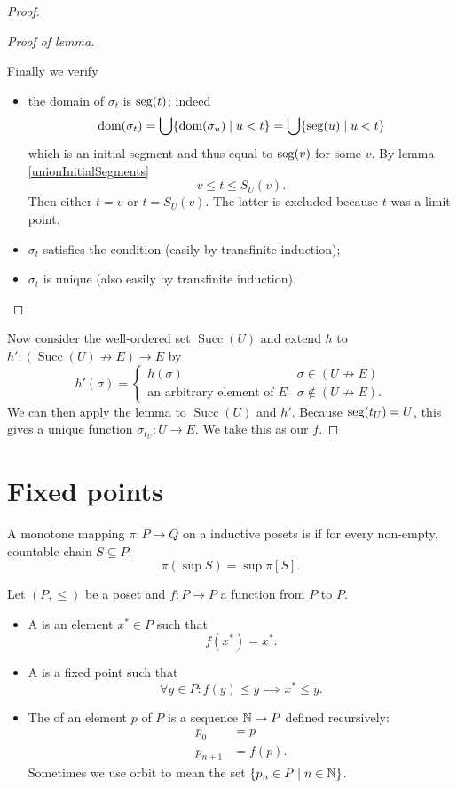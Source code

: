 \begin{proof}
\begin{proof}[Proof of lemma]
\begin{itemize}[leftmargin=2.5cm]
Finally we verify
\begin{itemize}
\item the domain of $\sigma_t$ is $\operatorname{seg}(t)$; indeed
\[ \operatorname{dom}(\sigma_t) = \bigcup\{\operatorname{dom}(\sigma_u)\;|\; u< t \} = \bigcup\{ \operatorname{seg}(u)\;|\; u<t \} \]
which is an initial segment and thus equal to $\operatorname{seg}(v)$ for some $v$. By lemma \ref{unionInitialSegments}
\[ v\leq t \leq S_U(v). \]
Then either $t=v$ or $t=S_U(v)$. The latter is excluded because $t$ was a limit point.
\item $\sigma_t$ satisfies the condition (easily by transfinite induction);
\item $\sigma_t$ is unique (also easily by transfinite induction).
\end{itemize}
\end{itemize}
\end{proof}

Now consider the well-ordered set $\operatorname{Succ}(U)$ and extend $h$ to $h': (\operatorname{Succ}(U)\not\to E) \to E$ by
\[ h'(\sigma) = \begin{cases}
h(\sigma) & \sigma\in (U\not\to E) \\
\text{an arbitrary element of $E$} & \sigma \notin (U\not\to E).
\end{cases} \]
We can then apply the lemma to $\operatorname{Succ}(U)$ and $h'$. Because $\operatorname{seg}(t_U) = U$, this gives a unique function $\sigma_{t_U}: U\to E$. We take this as our $f$.
\end{proof}


\chapter{Fixed points}

\begin{definition}
A monotone mapping $\pi : P \to Q$ on a inductive posets
 is  if for every non-empty, countable chain $S\subseteq P$:
 \[ \pi(\sup S) = \sup\pi[S]. \]
\end{definition}

\begin{definition}
Let $(P,\leq)$ be a poset and $f: P\to P$ a function from $P$ to $P$.
\begin{itemize}
\item A  is an element $x^*\in P$ such that
\[ f(x^*) = x^*. \]
\item A  is a fixed point such that
\[ \forall y\in P: f(y)\leq y \implies x^* \leq y. \]
\item The  of an element $p$ of $P$ is a sequence $\mathbb{N}\to P$ defined recursively:
\begin{align*}
p_0 &= p \\
p_{n+1} &= f(p).
\end{align*}
Sometimes we use orbit to mean the set $\{p_n\in P\;|\; n\in \mathbb{N}\}$.
\end{itemize}
\end{definition}

